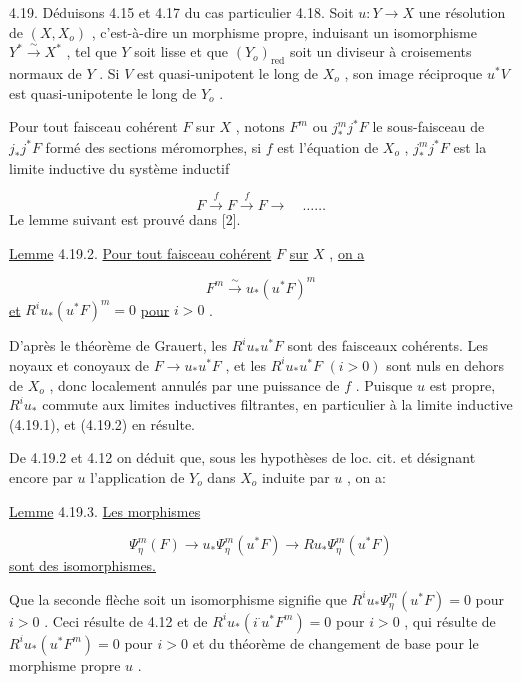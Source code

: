 4.19. Déduisons 4.15 et 4.17 du cas particulier 4.18. Soit $u : Y \longrightarrow X$ une résolution de $(X, X_o)$ , c'est-à-dire un morphisme propre, induisant un isomorphisme $Y^* \stackrel{\sim}{\longrightarrow} X^*$ , tel que $Y$ soit lisse et que $(Y_o)_{\mathrm{red}}$ soit un diviseur à croisements normaux de $Y$ . Si $V$ est quasi-unipotent le long de $X_o$ , son image réciproque $u^*V$ est quasi-unipotente le long de $Y_o$ .

Pour tout faisceau cohérent $F$ sur $X$ , notons $F^m$ ou $j^m_* j^* F$ le sous-faisceau de $j_* j^* F$ formé des sections méromorphes, si $f$ est l'équation de $X_o$ , $j^m_* j^* F$ est la limite inductive du système inductif

\begin{equation}\tag{4.19.1}
F \stackrel{f}{\longrightarrow} F \stackrel{f}{\longrightarrow} F \longrightarrow \quad \ldots\ldots
\end{equation}
Le lemme suivant est prouvé dans [2].

\underline{Lemme} 4.19.2. \underline{Pour tout faisceau cohérent} $F$ \underline{sur} $X$ , \underline{on a}

\begin{equation*}
F^m \stackrel{\sim}{\longrightarrow} u_*(u^* F)^m
\end{equation*}
\underline{et} $R^i u_* (u^* F)^m = 0$ \underline{pour} $i > 0$ .



D'après le théorème de Grauert, les $R^i u_* u^* F$ sont des faisceaux cohérents. Les noyaux et conoyaux de $F \longrightarrow u_* u^* F$ , et les $R^i u_* u^* F$ $(i > 0)$ sont nuls en dehors de $X_o$ , donc localement annulés par une puissance de $f$ . Puisque $u$ est propre, $R^i u_*$ commute aux limites inductives filtrantes, en particulier à la limite inductive (4.19.1), et (4.19.2) en résulte.

De 4.19.2 et 4.12 on déduit que, sous les hypothèses de loc. cit. et désignant encore par $u$ l'application de $Y_o$ dans $X_o$ induite par $u$ , on a:

\underline{Lemme} 4.19.3. \underline{Les morphismes}

\begin{equation*}
\Psi^m_\eta(F) \longrightarrow u_* \Psi^m_\eta(u^* F) \longrightarrow Ru_* \Psi^m_\eta(u^* F)
\end{equation*}
\underline{sont des isomorphismes.}

Que la seconde flèche soit un isomorphisme signifie que $R^i u_* \Psi^m_\eta(u^* F) = 0$ pour $i > 0$ . Ceci résulte de 4.12 et de $R^i u_*(i^{\cdot}u^* F^m) = 0$ pour $i > 0$ , qui résulte de $R^i u_*(u^* F^m) = 0$ pour $i > 0$ et du théorème de changement de base pour le morphisme propre $u$ .

